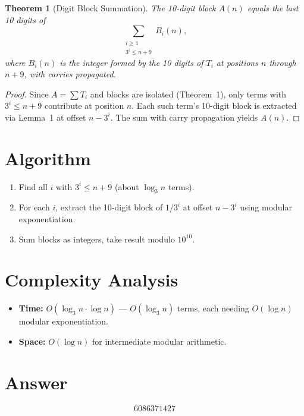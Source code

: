 \documentclass[11pt]{article}
\newtheorem{theorem}{Theorem}
\begin{document}
\begin{theorem}[Digit Block Summation]
The 10-digit block $A(n)$ equals the last 10 digits of
\[
\sum_{\substack{i \ge 1 \\ 3^i \le n+9}} B_i(n),
\]
where $B_i(n)$ is the integer formed by the 10 digits of $T_i$ at positions $n$ through $n+9$, with carries propagated.
\end{theorem}

\begin{proof}
Since $A = \sum T_i$ and blocks are isolated (Theorem~1), only terms with $3^i \le n+9$ contribute at position $n$. Each such term's 10-digit block is extracted via Lemma~1 at offset $n - 3^i$. The sum with carry propagation yields $A(n)$.
\end{proof}

\section{Algorithm}

\begin{enumerate}
\item Find all $i$ with $3^i \le n+9$ (about $\log_3 n$ terms).
\item For each $i$, extract the 10-digit block of $1/3^i$ at offset $n - 3^i$ using modular exponentiation.
\item Sum blocks as integers, take result modulo $10^{10}$.
\end{enumerate}

\section{Complexity Analysis}

\begin{itemize}
\item \textbf{Time:} $O(\log_3 n \cdot \log n)$ --- $O(\log_3 n)$ terms, each needing $O(\log n)$ modular exponentiation.
\item \textbf{Space:} $O(\log n)$ for intermediate modular arithmetic.
\end{itemize}

\section{Answer}

\[
\boxed{6086371427}
\]
\end{document}
